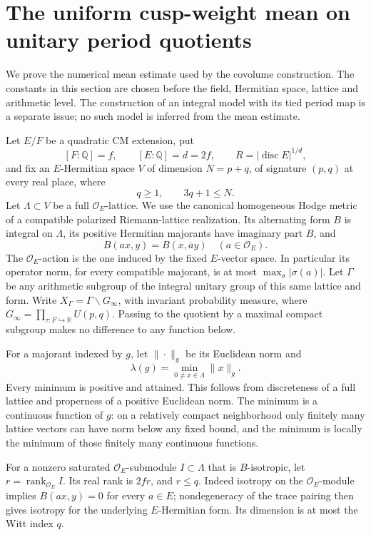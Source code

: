 \section{The uniform cusp-weight mean on unitary period quotients}
\label{sec:sr-uniform-cusp-mean}

We prove the numerical mean estimate used by the covolume
construction.  The constants in this section are chosen before the
field, Hermitian space, lattice and arithmetic level.
The construction of an integral model with its tied period map is a
separate issue; no such model is inferred from the mean estimate.

Let \(E/F\) be a quadratic CM extension, put
\[
 [F:\mathbb Q]=f,\qquad [E:\mathbb Q]=d=2f,\qquad
 R=|\operatorname{disc}E|^{1/d},
\]
and fix an \(E\)-Hermitian space \(V\) of dimension \(N=p+q\),
of signature \((p,q)\) at every real place, where
\[
                   q\ge1,\qquad 3q+1\le N .
\]
Let \(\Lambda\subset V\) be a full \(\mathcal O_E\)-lattice.
We use the canonical homogeneous Hodge metric of a compatible
polarized Riemann-lattice realization.  Its alternating form \(B\) is integral on \(\Lambda\), its positive
Hermitian majorants have imaginary part \(B\), and
\[
 B(ax,y)=B(x,\overline a y)\quad(a\in\mathcal O_E).
\]
The \(\mathcal O_E\)-action is the one induced by the fixed
\(E\)-vector space.  In particular its operator norm, for every
compatible majorant, is at most
\(\max_\sigma|\sigma(a)|\).
Let \(\Gamma\) be any arithmetic subgroup of the integral
unitary group of this same lattice and form.
Write \(X_\Gamma=\Gamma\backslash G_\infty\), with invariant
probability measure, where
\(G_\infty=\prod_{\tau:F\hookrightarrow\mathbb R}U(p,q)\).
Passing to the quotient by a maximal compact subgroup makes no
difference to any function below.

For a majorant indexed by \(g\), let \(\|\cdot\|_g\) be its
Euclidean norm and
\[
                  \lambda(g)=
                     \min_{0\ne x\in\Lambda}\|x\|_g .
\]
Every minimum is positive and attained.  This follows from
discreteness of a full lattice and properness of a positive
Euclidean norm.  The minimum is a continuous function of \(g\):
on a relatively compact neighborhood only finitely many lattice
vectors can have norm below any fixed bound, and the minimum is
locally the minimum of those finitely many continuous functions.

For a nonzero saturated \(\mathcal O_E\)-submodule \(I\subset\Lambda\)
that is \(B\)-isotropic, let \(r=\operatorname{rank}_{\mathcal O_E}I\).
Its real rank is \(2fr\), and \(r\le q\).
Indeed isotropy on the \(\mathcal O_E\)-module implies
\(B(ax,y)=0\) for every \(a\in E\); nondegeneracy of the trace
pairing then gives isotropy for the underlying \(E\)-Hermitian
form.  Its dimension is at most the Witt index \(q\).

